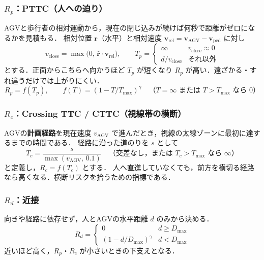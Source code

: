 \subsubsection{$R_p$：PTTC（人への迫り）}
AGVと歩行者の相対運動から，現在の閉じ込みが続けば何秒で距離がゼロになるかを見積もる．
相対位置 $\mathbf{r}$（水平）と相対速度 $\mathbf{v}_\text{rel}=\mathbf{v}_\text{AGV}-\mathbf{v}_\text{ped}$ に対し
\begin{equation}
  v_\text{close}=\max\!\bigl(0,\,\hat{\mathbf{r}}\cdot\mathbf{v}_\text{rel}\bigr),\qquad
  T_p=
  \begin{cases}
  \infty & v_\text{close}\approx 0 \\
  d/v_\text{close} & \text{それ以外}
  \end{cases}
\end{equation}
とする．正面からこちらへ向かうほど $T_p$ が短くなり $R_p$ が高い．遠ざかる・すれ違うだけでは上がりにくい．
\begin{equation}
  R_p=f(T_p),\qquad
  f(T)=(1-T/T_\text{max})^{\gamma}
  \quad\text{（$T=\infty$ または $T>T_\text{max}$ なら $0$）}
\end{equation}

\subsubsection{$R_c$：Crossing TTC / CTTC（視線帯の横断）}
AGVの\textbf{計画経路}を現在速度 $v_\text{AGV}$ で進んだとき，視線の太線ゾーンに最初に達するまでの時間である．
経路に沿った道のりを $s$ として
\begin{equation}
  T_c=\frac{s}{\max(v_\text{AGV},\,0.1)}
  \quad\text{（交差なし，または $T_c>T_\text{max}$ なら $\infty$）}
\end{equation}
と定義し，$R_c=f(T_c)$ とする．
人へ直進していなくても，前方を横切る経路なら高くなる．横断リスクを拾うための指標である．

\subsubsection{$R_d$：近接}
向きや経路に依存せず，人とAGVの水平距離 $d$ のみから決める．
\begin{equation}
  R_d=
  \begin{cases}
  0 & d \ge D_\text{max} \\
  (1-d/D_\text{max})^{\gamma} & d < D_\text{max}
  \end{cases}
\end{equation}
近いほど高く，$R_p$・$R_c$ が小さいときの下支えとなる．

